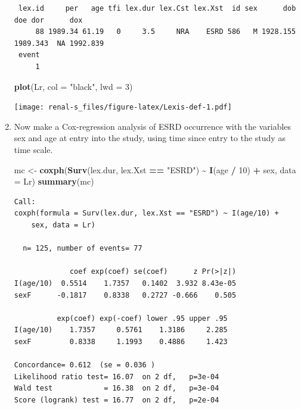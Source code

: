 \documentclass[
]{book}
\newenvironment{Shaded}{\begin{snugshade}}{\end{snugshade}}
\newcommand{\AttributeTok}[1]{\textcolor[rgb]{0.13,0.29,0.53}{#1}}
\newcommand{\DecValTok}[1]{\textcolor[rgb]{0.00,0.00,0.81}{#1}}
\newcommand{\FunctionTok}[1]{\textcolor[rgb]{0.13,0.29,0.53}{\textbf{#1}}}
\newcommand{\NormalTok}[1]{#1}
\newcommand{\OtherTok}[1]{\textcolor[rgb]{0.56,0.35,0.01}{#1}}
\newcommand{\SpecialCharTok}[1]{\textcolor[rgb]{0.81,0.36,0.00}{\textbf{#1}}}
\newcommand{\StringTok}[1]{\textcolor[rgb]{0.31,0.60,0.02}{#1}}
\begin{document}
\begin{enumerate}
\begin{verbatim}
 lex.id     per   age tfi lex.dur lex.Cst lex.Xst  id sex      dob      doe dor      dox
     88 1989.34 61.19   0     3.5     NRA    ESRD 586   M 1928.155 1989.343  NA 1992.839
 event
     1
\end{verbatim}

\begin{Shaded}
\begin{Highlighting}[]
\FunctionTok{plot}\NormalTok{(Lr, }\AttributeTok{col =} \StringTok{"black"}\NormalTok{, }\AttributeTok{lwd =} \DecValTok{3}\NormalTok{)}
\end{Highlighting}
\end{Shaded}

  \texttt{[image: renal-s\_files/figure-latex/Lexis-def-1.pdf]}
\item
  Now make a Cox-regression analysis of ESRD occurrence with
  the variables sex and age at entry into the study, using time
  since entry to the study as time scale.

\begin{Shaded}
\begin{Highlighting}[]
\NormalTok{mc }\OtherTok{\textless{}{-}} \FunctionTok{coxph}\NormalTok{(}\FunctionTok{Surv}\NormalTok{(lex.dur, lex.Xst }\SpecialCharTok{==} \StringTok{"ESRD"}\NormalTok{) }
            \SpecialCharTok{\textasciitilde{}} \FunctionTok{I}\NormalTok{(age }\SpecialCharTok{/} \DecValTok{10}\NormalTok{) }\SpecialCharTok{+}\NormalTok{ sex, }\AttributeTok{data =}\NormalTok{ Lr)}
\FunctionTok{summary}\NormalTok{(mc)}
\end{Highlighting}
\end{Shaded}

\begin{verbatim}
Call:
coxph(formula = Surv(lex.dur, lex.Xst == "ESRD") ~ I(age/10) + 
    sex, data = Lr)

  n= 125, number of events= 77 

             coef exp(coef) se(coef)      z Pr(>|z|)
I(age/10)  0.5514    1.7357   0.1402  3.932 8.43e-05
sexF      -0.1817    0.8338   0.2727 -0.666    0.505

          exp(coef) exp(-coef) lower .95 upper .95
I(age/10)    1.7357     0.5761    1.3186     2.285
sexF         0.8338     1.1993    0.4886     1.423

Concordance= 0.612  (se = 0.036 )
Likelihood ratio test= 16.07  on 2 df,   p=3e-04
Wald test            = 16.38  on 2 df,   p=3e-04
Score (logrank) test = 16.77  on 2 df,   p=2e-04
\end{verbatim}


\end{enumerate}
\end{document}
